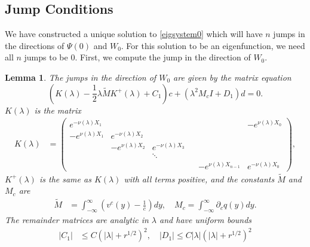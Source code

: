 \documentclass[10pt,reqno]{amsart}
\theoremstyle{plain}
\newtheorem{lemma}[theorem]{Lemma}
\theoremstyle{definition}
\theoremstyle{remark}
\numberwithin{theorem}{section}
\numberwithin{equation}{section}
\begin{document}
\subsection{Jump Conditions}

We have constructed a unique solution to \cref{eigsystem0} which will have $n$ jumps in the directions of $\Psi(0)$ and $W_0$. For this solution to be an eigenfunction, we need all $n$ jumps to be 0. First, we compute the jump in the direction of $W_0$. 

\begin{lemma}\label{jumpcenteradj}
The jumps in the direction of $W_0$ are given by the matrix equation
\begin{equation}\label{matrixjumpc}
\left( K(\lambda) - \frac{1}{2} \lambda \tilde{M} K^+(\lambda) + C_1 \right) c + \left(\lambda^2 M_c I + D_1\right) d = 0.
\end{equation}
$K(\lambda)$ is the matrix
\begin{align*}
K(\lambda) &=  
\begin{pmatrix}
e^{-\nu(\lambda)X_1} & & & & & -e^{\nu(\lambda)X_0} \\
-e^{\nu(\lambda)X_1} & e^{-\nu(\lambda)X_2} \\
& -e^{\nu(\lambda)X_2} & e^{-\nu(\lambda)X_3} \\
  & & \ddots & && \\
& & & & -e^{\nu(\lambda)X_{n-1}} & e^{-\nu(\lambda)X_0}
\end{pmatrix},
\end{align*}
$K^+(\lambda)$ is the same as $K(\lambda)$ with all terms positive, and the constants $\tilde{M}$ and $M_c$ are
\begin{align*}
\tilde{M} &= \int_{-\infty}^{\infty} \left(v^c(y) - \frac{1}{c}\right) dy, \quad
M_c = \int_{-\infty}^\infty \partial_c q(y) dy.
\end{align*}
The remainder matrices are analytic in $\lambda$ and have uniform bounds
\begin{align}\label{centerjumprem}
|C_1| &\leq C (|\lambda| + r^{1/2})^2, \quad
|D_1| \leq C |\lambda|(|\lambda| + r^{1/2})^2
\end{align}


\end{lemma}
\end{document}

